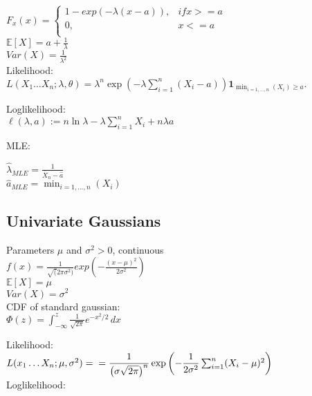 $ F_x(x)=
	\begin{cases}
		 1-exp(-\lambda(x-a)),&{if x >= a}\\
		0,&{x <= a}\\
	\end{cases}
$\\

$\mathbb{E}[X]=a + \frac{1}{\lambda}$\\

$Var(X)=\frac{1}{\lambda^2}$\\

Likelihood:\\

$L(X_1\dots X_n;\lambda,\theta)= \lambda ^ n \exp \left( -\lambda \sum _{i = 1}^ n (X_ i - a) \right) \mathbf{1}_{\min _{i = 1, \ldots , n}(X_ i) \geq a}.$

Loglikelihood:\\

$\ell (\lambda , a) := n \ln \lambda - \lambda \sum _{i = 1}^ n X_ i + n \lambda a$

MLE:

$\hat{\lambda }_{MLE} = \frac{1}{\overline{X}_ n - \hat{a}}$\\

$\hat{a}_{MLE} = \min _{i =1, \ldots , n}(X_ i)$

\subsection*{Univariate Gaussians}
Parameters $\mu$ and $\sigma^2 >0$, continuous\\
$f(x)= \frac{1}{\sqrt(2 \pi \sigma^2)} exp(-\frac{(x-\mu)^2}{2\sigma^2})$ \\
$\mathbb{E}[X]=\mu$ \\
$Var(X)=\sigma^2$\\

CDF of standard gaussian:\\

$\Phi (z) = \int _{-\infty }^ z \frac{1}{\sqrt{2 \pi }} e^{-x^2/2} \,  dx$

Likelihood:\\

$L(x_1\dots X_n;\mu,\sigma^2)=\\ 
= \dfrac{1}{\left(\sigma\sqrt{2\pi}\right)^n}\exp{\left(-\dfrac{1}{2\sigma^2}\sum_{i=1}^n (X_i-\mu)^2 \right)}$\\

Loglikelihood:\\

